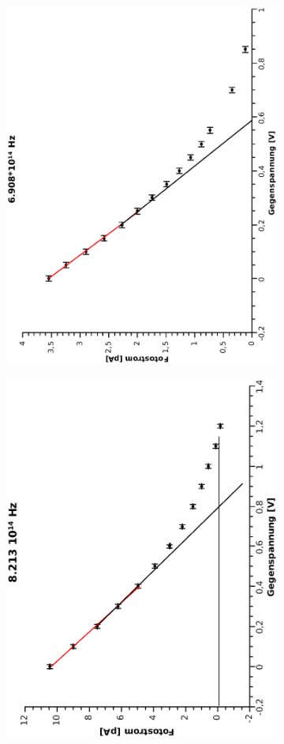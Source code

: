 \documentclass[12pt]{article}
\begin{document}
\begin{figure}
\begin{subfigure}{0.48\textwidth}
\end{subfigure}
\begin{subfigure}{0.48\textwidth}
\includegraphics[width=0.75\linewidth, angle=-90]{6908.eps}
\end{subfigure}
\begin{subfigure}{0.48\textwidth}
\includegraphics[width=0.75\linewidth, angle=-90]{8213.eps}
\end{subfigure}
\end{figure}
\end{document}
